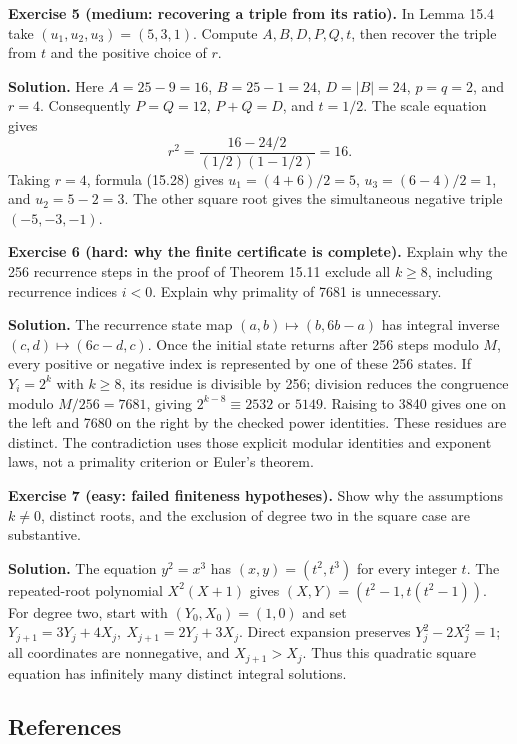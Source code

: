 \documentclass[
  11pt,
  a4paper,
]{article}
\begin{document}
\textbf{Exercise 5 (medium: recovering a triple from its ratio).} In
Lemma 15.4 take \((u_1,u_2,u_3)=(5,3,1)\). Compute \(A,B,D,P,Q,t\), then
recover the triple from \(t\) and the positive choice of \(r\).

\textbf{Solution.} Here \(A=25-9=16\), \(B=25-1=24\), \(D=|B|=24\),
\(p=q=2\), and \(r=4\). Consequently \(P=Q=12\), \(P+Q=D\), and
\(t=1/2\). The scale equation gives \[
r^2=\frac{16-24/2}{(1/2)(1-1/2)}=16.
\] Taking \(r=4\), formula (15.28) gives \(u_1=(4+6)/2=5\),
\(u_3=(6-4)/2=1\), and \(u_2=5-2=3\). The other square root gives the
simultaneous negative triple \((-5,-3,-1)\).

\textbf{Exercise 6 (hard: why the finite certificate is complete).}
Explain why the 256 recurrence steps in the proof of Theorem 15.11
exclude all \(k\ge8\), including recurrence indices \(i<0\). Explain why
primality of 7681 is unnecessary.

\textbf{Solution.} The recurrence state map \((a,b)\mapsto(b,6b-a)\) has
integral inverse \((c,d)\mapsto(6c-d,c)\). Once the initial state
returns after 256 steps modulo \(M\), every positive or negative index
is represented by one of these 256 states. If \(Y_i=2^k\) with
\(k\ge8\), its residue is divisible by 256; division reduces the
congruence modulo \(M/256=7681\), giving \(2^{k-8}\equiv2532\) or
\(5149\). Raising to 3840 gives one on the left and 7680 on the right by
the checked power identities. These residues are distinct. The
contradiction uses those explicit modular identities and exponent laws,
not a primality criterion or Euler's theorem.

\textbf{Exercise 7 (easy: failed finiteness hypotheses).} Show why the
assumptions \(k\ne0\), distinct roots, and the exclusion of degree two
in the square case are substantive.

\textbf{Solution.} The equation \(y^2=x^3\) has \((x,y)=(t^2,t^3)\) for
every integer \(t\). The repeated-root polynomial \(X^2(X+1)\) gives
\((X,Y)=(t^2-1,t(t^2-1))\). For degree two, start with
\((Y_0,X_0)=(1,0)\) and set \(Y_{j+1}=3Y_j+4X_j,\ X_{j+1}=2Y_j+3X_j\).
Direct expansion preserves \(Y_j^2-2X_j^2=1\); all coordinates are
nonnegative, and \(X_{j+1}>X_j\). Thus this quadratic square equation
has infinitely many distinct integral solutions.

\subsection{References}\label{references}
\end{document}
